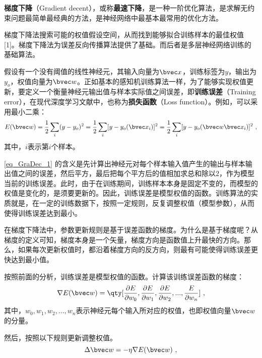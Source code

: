 

\textbf{梯度下降}（Gradient decent），或称\textbf{最速下降}，是一种一阶优化算法，是求解无约束问题最简单最经典的方法，是神经网络中最基本最常用的优化方法。

梯度下降法搜索可能的权值假设空间，从而找到能够拟合训练样本的最佳权值 [1]。梯度下降法为误差反向传播算法提供了基础。而后者是多层神经网络训练的基础算法。

假设有一个没有阈值的线性神经元，其输入向量为$\bvec x$，训练标签为$y$，输出为$y_o$，权值向量为$\bvec w$。正如基本的感知机训练算法一样，为了能够实现权值更新，要定义一个衡量神经元输出值与样本实际值之间误差，即\textbf{训练误差}（Training error），在现代深度学习文献中，也称为\textbf{损失函数}（Loss function）。例如，可以采用最小二乘：
\begin{equation}\label{eq_GraDec_1}
E(\bvec w)=\frac{1}{2}\sum_i(y-y_o)^2=\frac{1}{2}\sum_i[y-y_o(\bvec x_i)]^2=\frac{1}{2}\sum_i[y-y_o(\bvec w \bvec x_i)]^2~,
\end{equation}
其中，$i$表示第$i$个样本。

\autoref{eq_GraDec_1} 的含义是先计算出神经元对每个样本输入值产生的输出与样本输出值之间的误差，然后平方，最后把每个平方后的值相加求总和除以$2$，作为模型当前的训练误差。此时，由于在训练期间，训练样本本身是固定不变的，而模型的权值是变化的，是须要更新的。因此，训练误差是模型权值的函数。训练算法的实质就是，在一定的训练数据下，按照一定规则，反复调整权值（模型参数），从而使得训练误差达到最小。

在梯度下降法中，参数更新规则是基于误差函数的梯度。为什么是基于梯度呢？从梯度的定义可知，梯度本身是一个矢量，梯度方向是函数值上升最快的方向。那么，如果每次更新权值时，都沿着梯度方向的反方向，则最有可能使得训练误差更快达到最小值。

按照前面的分析，训练误差是模型权值的函数。计算该训练误差函数的梯度：
\begin{equation}
\nabla E(\bvec w)=\qty[\frac{\partial E}{\partial w_0},\frac{ \partial E}{\partial w_1},\frac{\partial E}{\partial w_2},...,\frac{E}{\partial w_n}]~,
\end{equation}
其中，$w_0,w_1,w_2, ..., w_n$表示神经元每个输入所对应的权值，也即权值向量$\bvec w$的分量。

然后，按照以下规则更新调整权值。
\begin{equation}\label{eq_GraDec_2}
\Delta \bvec w = - \eta \nabla E(\bvec w)~,
\end{equation}

